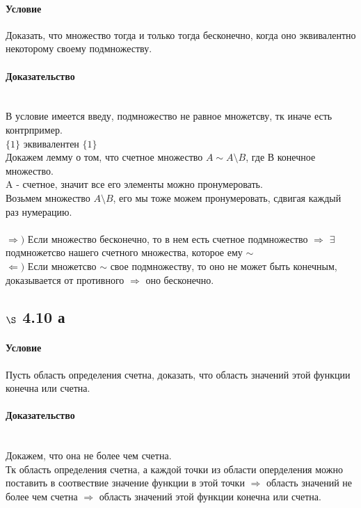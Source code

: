 \documentclass[a4paper,12pt]{article}
\begin{document}
\paragraph*{Условие}
Доказать, что множество тогда и только тогда бесконечно, когда оно эквивалентно некоторому своему подмножеству.
\paragraph*{Доказательство}\mbox{}\\
В условие имеется введу, подмножество не равное множетсву, тк иначе есть контрпример.\\
$\{1\}$ эквивалентен $\{1\}$\\
Докажем лемму о том, что счетное множество $ A \sim A \setminus B $, где В конечное множество.\\
A - счетное, значит все его элементы можно пронумеровать. \\
Возьмем множество  $A \setminus B $, его мы тоже можем пронумеровать, сдвигая каждый раз нумерацию.\\
\\
$\Rightarrow ) $ Если множество бесконечно, то в нем есть счетное подмножество $\Rightarrow$ $\exists$ подмножетсво нашего счетного множества, которое ему  $ \sim $\\
$\Leftarrow )$ Если множетсво $ \sim $ свое подмножеству, то оно не может быть конечным, доказывается от противного $\Rightarrow$ оно бесконечно.

\subsection*{$\S$ 4.10 а}
\paragraph*{Условие}
Пусть область определения счетна, доказать, что область значений этой функции конечна или счетна. \paragraph*{Доказательство}\mbox{}\\
Докажем, что она не более чем счетна.\\
Тк область определения счетна, а каждой точки из области оперделения можно поставить в соотвествие значение функции в этой точки $\Rightarrow$ область значений не более чем счетна $\Rightarrow$ область значений этой функции конечна или счетна.\\
\end{document}
